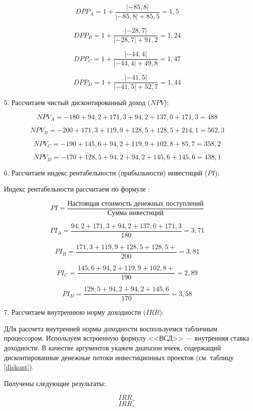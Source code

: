 \[ DPP_A =  1 + \dfrac{|-85,8|}{|-85,8| + 85,5} = 1,5\]

\[ DPP_B =  1 + \dfrac{|-28,7|}{|-28,7| + 91,2} = 1,24\]

\[ DPP_C =  1 + \dfrac{|-44,4|}{|-44,4| + 49,8} = 1,47 \]

\[ DPP_D = 1+ \dfrac{|-41,5|}{|-41,5| + 52,7} = 1,44 \]

5. Рассчитаем чистый дисконтированный доход ($NPV$):

\[ NPV_A =  -180 + 94,2  +171,3 + 94,2  + 137,0 + 171,3  = 488\]

\[ NPV_B =-200 +171,3 + 119,9 + 128,5 + 128,5 + 214,1 =562,3\]

\[ NPV_C =  -190+145,6+94,2+119,9+102,8+85,7=358,2\]

\[ NPV_D = -170+128,5+94,2+94,2+145,6+145,6=438,1\]

6. Рассчитаем индекс рентабельности (прибыльности) инвестиций ($PI$):

Индекс рентабельности рассчитаем по формуле \cite[218]{leontev}:

\[ PI = \dfrac{\text{Настоящая стоимость денежных поступлений}}{\text{Сумма инвестиций}} \]

\[ PI_A = \dfrac{94,2 +	171,3 +	94,2 	+137,0 +171,3
}{180}= 3,71\]

\[ PI_B = \dfrac{171,3 +	119,9 +	128,5 	+128,5 
+}{200}=3,81 \]

\[ PI_C = \dfrac{145,6 +	94,2 +	119,9 +	102,8 +}{190}= 2,89\]

\[ PI_D = \dfrac{128,5 +	94,2 +	94,2 +	145,6 
}{170}= 3,58\]

7. Рассчитаем внутреннюю норму доходности ($IRR$):

ДЛя рассчета внутренней нормы доходности воспользуемся табличным процессором. Используем встроенную формулу <<ВСД>> --- внутренняя ставка доходности. В качестве аргументов укажем диапазон ячеек, содержащий дисконтированные денежные потоки инвестиционных проектов (см. таблицу \ref{diskont}).

Получены следующие результаты:

\[ IRR_ = \]
\[ IRR_ = \]


\begin{table}[!h]
		\label{final11}
	\caption{Показатели эффективности инвестиционных проектов}
\end{table}

